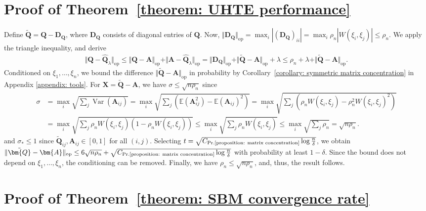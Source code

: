 \documentclass[11pt]{article}
\newcommand{\op}{\mathrm{op}}
\newcommand{\bA}{\bm{A}}
\newcommand{\bQ}{\bm{Q}}
\newcommand{\Var}{\operatorname{Var}}
\newcommand{\bbE}{\mathbb{E}}
\newcommand{\bX}{\bm{X}}
\newcommand{\bD}{\bm{D}}
\newcommand{\constantBandeira}{C_{\text{Pr.\ref{proposition: matrix concentration}}}}
\newcommand{\<}{\langle}
\renewcommand{\>}{\rangle}
\theoremstyle{plain}
\theoremstyle{definition}
\theoremstyle{remark}
\begin{document}
\section{Proof of Theorem~\ref{theorem: UHTE performance}}
\label{appendix: proof of HTE estimator error}

Define $\tilde{\bQ} = \bQ - \bD_{\bQ}$, where $\bD_{\bQ}$ consists of diagonal entries of $\bQ$. Now, $\Vert \bD_{\bQ} \Vert_{\op} = \max_i |(\bD_{\bQ})_{ii}| = \max_i \rho_n |W(\xi_i, \xi_j)| \le \rho_n$. 
We apply the triangle inequality, and derive
\begin{align*}
	\Vert \bQ - \widehat{\bQ}_\lambda \Vert_{\op} \le \Vert \bQ - \bA \Vert_{\op}+\Vert  \bA - \widehat{\bQ}_\lambda\Vert_{\op} =  \Vert \bD_{\bQ} \Vert_{\op}+ \Vert \tilde{\bQ}  - \bA \Vert_{\op} + \lambda \le \rho_n + \lambda + \Vert \tilde{\bQ} - \bA \Vert_{\op}.
\end{align*}
Conditioned on $\xi_1, \ldots, \xi_n$, we bound the difference $\Vert \tilde{\bQ} - \bA \Vert_{\op}$ in probability by Corollary~\ref{corollary: symmetric matrix concentration} in Appendix \ref{appendix: tools}. For $\bX=\tilde{\bQ} - \bA$, we have $\sigma \leq \sqrt{n \rho_n}$ since
\begin{align*}
    \sigma &= \max_i \sqrt{\sum_{j} \Var(\bA_{ij})} = \max_i \sqrt{\sum_j \left(\bbE(\bA_{ij}^2) - \bbE(\bA_{ij})^2\right)} = \max_i \sqrt{\sum_j \left(\rho_n W(\xi_i, \xi_j) - \rho_n^2 W(\xi_i, \xi_j)^2\right)} \\
    &= \max_i \sqrt{\sum_j \rho_n W(\xi_i, \xi_j)\left(1 - \rho_n W(\xi_i, \xi_j)\right)} \leq \max_i \sqrt{\sum_j \rho_n W(\xi_i, \xi_j)} \leq \max_i \sqrt{\sum_j \rho_n} = \sqrt{n \rho_n}. 
\end{align*}
and $\sigma_* \le 1$ since $\tilde{\bQ}_{ij}, \bA_{ij} \in [0,1]$ for all $(i,j)$. Selecting $t=\sqrt{\constantBandeira \log \frac{n}{\delta}}$, we obtain $\Vert \tilde{\bQ} - \bA \Vert_{\op} \le 6 \sqrt{n \rho_n} + \sqrt{\constantBandeira \log \frac{n}{\delta}}$ with probability at least $1 -\delta$. Since the bound does not depend on $\xi_1, \ldots, \xi_n$, the conditioning can be removed. Finally, we have $\rho_n \le \sqrt{n \rho_n}$, and, thus, the result follows.
 

\section{Proof of Theorem~\ref{theorem: SBM convergence rate}}
\label{appendix: proof of SBM convergence rate}
\end{document}

